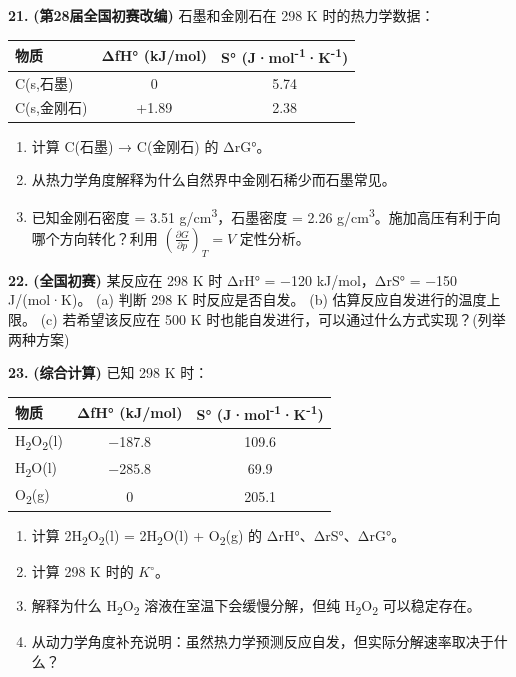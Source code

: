 \documentclass[a4paper,11pt]{ctexart}
\providecommand{\tightlist}{\setlength{\itemsep}{0pt}\setlength{\parskip}{0pt}}
\newcounter{none}
\begin{document}
\textbf{21.} \textbf{(第28届全国初赛改编)} 石墨和金刚石在 298 K 时的热力学数据：

{\def\LTcaptype{none} %
\begin{longtable}[]{@{}lcc@{}}
\toprule\noalign{}
物质 & ΔfH° (kJ/mol) & S° (J·mol\textsuperscript{-1}·K\textsuperscript{-1}) \\
\midrule\noalign{}
\endhead
\bottomrule\noalign{}
\endlastfoot
C(s,石墨) & 0 & 5.74 \\
C(s,金刚石) & +1.89 & 2.38 \\
\end{longtable}
}

\begin{enumerate}
\def\labelenumi{(\alph{enumi})}
\tightlist
\item
  计算 C(石墨) → C(金刚石) 的 ΔrG°。
\item
  从热力学角度解释为什么自然界中金刚石稀少而石墨常见。
\item
  已知金刚石密度 = 3.51 g/cm\textsuperscript{3}，石墨密度 = 2.26 g/cm\textsuperscript{3}。施加高压有利于向哪个方向转化？利用 \(\left(\frac{\partial G}{\partial p}\right)_T = V\) 定性分析。
\end{enumerate}

\textbf{22.} \textbf{(全国初赛)} 某反应在 298 K 时 ΔrH° = −120 kJ/mol，ΔrS° = −150 J/(mol·K)。
(a) 判断 298 K 时反应是否自发。
(b) 估算反应自发进行的温度上限。
(c) 若希望该反应在 500 K 时也能自发进行，可以通过什么方式实现？(列举两种方案)

\textbf{23.} \textbf{(综合计算)} 已知 298 K 时：

{\def\LTcaptype{none} %
\begin{longtable}[]{@{}lcc@{}}
\toprule\noalign{}
物质 & ΔfH° (kJ/mol) & S° (J·mol\textsuperscript{-1}·K\textsuperscript{-1}) \\
\midrule\noalign{}
\endhead
\bottomrule\noalign{}
\endlastfoot
H\textsubscript{2}O\textsubscript{2}(l) & −187.8 & 109.6 \\
H\textsubscript{2}O(l) & −285.8 & 69.9 \\
O\textsubscript{2}(g) & 0 & 205.1 \\
\end{longtable}
}

\begin{enumerate}
\def\labelenumi{(\alph{enumi})}
\tightlist
\item
  计算 2H\textsubscript{2}O\textsubscript{2}(l) = 2H\textsubscript{2}O(l) + O\textsubscript{2}(g) 的 ΔrH°、ΔrS°、ΔrG°。
\item
  计算 298 K 时的 \(K^{\circ}\)。
\item
  解释为什么 H\textsubscript{2}O\textsubscript{2} 溶液在室温下会缓慢分解，但纯 H\textsubscript{2}O\textsubscript{2} 可以稳定存在。
\item
  从动力学角度补充说明：虽然热力学预测反应自发，但实际分解速率取决于什么？
\end{enumerate}
\end{document}
